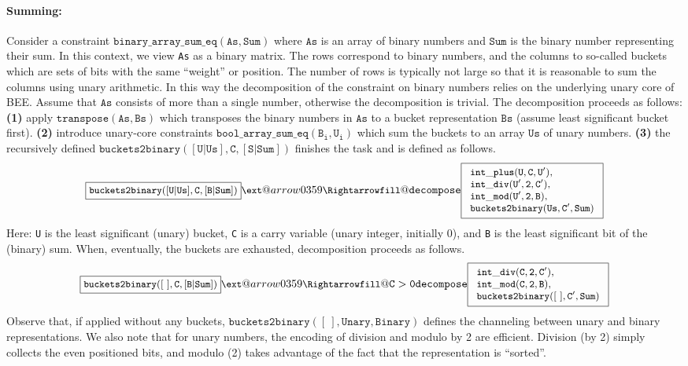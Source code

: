 \documentclass[runningheads,a4paper]{llncs}
\makeatletter
\newcommand{\xRightarrow}[2][]{\ext@arrow 0359\Rightarrowfill@{#1}{#2}}
\newcommand{\bee}{\textsf{BEE}}
\makeatother
\begin{document}
\paragraph{\bf Summing:~~}

Consider a constraint $\mathtt{binary\_array\_sum\_eq(As,Sum)}$ where
$\mathtt{As}$ is an array of binary numbers and $\mathtt{Sum}$ is the
binary number representing their sum.  
In this context, we view \texttt{As} as a binary matrix. The rows
correspond to binary numbers, and the columns to so-called buckets
which are sets of bits with the same ``weight'' or position.
The number of rows is typically not large so that it is reasonable to
sum the columns using unary arithmetic. In this way the decomposition
of the constraint on binary numbers relies on the underlying unary
core of \bee.
Assume that $\mathtt{As}$ consists of more than a single number,
otherwise the decomposition is trivial. The decomposition proceeds as
follows: 
\textbf{(1)} apply $\mathtt{transpose(As,Bs)}$ which transposes the
binary numbers in $\mathtt{As}$ to a bucket representation
$\mathtt{Bs}$ (assume least significant bucket first). \textbf{(2)}
introduce unary-core constraints
$\mathtt{bool\_array\_sum\_eq(B_i,U_i)}$ which sum the buckets to an
array $\mathtt{Us}$ of unary numbers. \textbf{(3)} the recursively
defined $\mathtt{buckets2binary([U|Us],C,[S|Sum])}$ finishes the task
and is defined as follows. 
\[\small \fbox{$\mathtt{buckets2binary([U|Us],C,[B|Sum])}$}
    \xRightarrow[]{\mathtt{decompose}}
    \fbox{$
  \begin{array}{l}
    \mathtt{int\_plus(U,C,U')},\\
    \mathtt{int\_div(U',2,C')},\\
    \mathtt{int\_mod(U',2,B)}, \\
    \mathtt{buckets2binary(Us,C',Sum)}
  \end{array}$}
\]
Here: \texttt{U} is the least significant (unary) bucket, \texttt{C}
is a carry variable (unary integer, initially 0), and \texttt{B} is the
least significant bit of the  (binary) sum.
When, eventually, the buckets are exhausted, decomposition proceeds
as follows.
\[\small \fbox{$\mathtt{buckets2binary([~],C,[B|Sum])}$}
    \xRightarrow[\mathtt{C>0}]{\mathtt{decompose}}
    \fbox{$
  \begin{array}{l}
    \mathtt{int\_div(C,2,C')},\\
    \mathtt{int\_mod(C,2,B)}, \\
    \mathtt{buckets2binary([~],C',Sum)}
  \end{array}$}
\]
Observe that, if applied without any buckets,
$\mathtt{buckets2binary([~],Unary,Binary)}$ defines the channeling
between unary and binary representations.
We also note that for unary numbers, the encoding of division and
modulo by 2 are efficient. Division (by 2) simply collects the even
positioned bits, and modulo (2) takes advantage of the fact that the
representation is ``sorted''.
\end{document}
